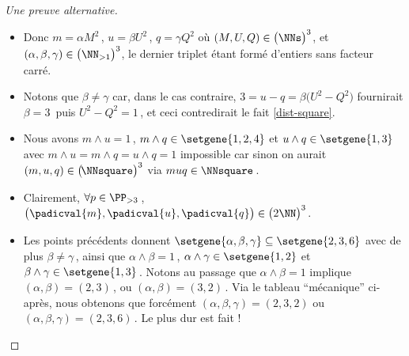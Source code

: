\begin{proof}[Une preuve alternative]
\begin{itemize}
\begin{enumerate}
			\item $q \in \NNsquare$ donne les équivalences logiques suivantes qui lèvent une contradiction.

        	\smallskip

			\begin{stepcalc}[style = sar, ope = \iff]
        		m^2 - 4 \in \NNsquare
        	\explnext{}
        		\exists r \in \NN \,.\, \big( m^2 - r^2 = 4 \big)
        		m = 2
        	\end{stepcalc}
		\end{enumerate}		





		\item Donc $m = \alpha M^2$\,, $u = \beta U^2$\,, $q = \gamma Q^2$ où $(M, U, Q) \in \big( \NNs \big)^3$, et $(\alpha, \beta, \gamma) \in \big( \NN_{>1} \big)^3$, le dernier triplet étant formé d'entiers sans facteur carré.


		\item Notons que $\beta \neq \gamma$ car, dans le cas contraire, $3 = u - q = \beta \big( U^2 - Q^2 \big)$ fournirait $\beta = 3$\, puis $U^2 - Q^2 = 1$\,, et ceci contredirait le fait \ref{dist-square}.


		\item Nous avons $m \wedge u = 1$\,, $m \wedge q \in \setgene{1, 2, 4}$ et $u \wedge q \in \setgene{1, 3}$
		avec $m \wedge u = m \wedge q = u \wedge q = 1$ impossible car sinon on aurait $(m, u, q) \in \big( \kern-1.5pt\NNsquare \big)^3$ via $muq \in \NNsquare$\,.


		\item Clairement, $\forall p \in \PP_{>3}$\,, $\big( \padicval{m} , \padicval{u} , \padicval{q} \big) \in \big( 2 \NN \big)^3$.


		\item Les points précédents donnent 
		$\setgene{\alpha, \beta, \gamma} \subseteq \setgene{2, 3, 6}$
		avec de plus
		$\beta \neq \gamma$\,,
		ainsi que 
		$\alpha \wedge \beta = 1$\,, $\alpha \wedge \gamma \in \setgene{1, 2}$ et $\beta \wedge \gamma \in \setgene{1, 3}$\,.
		Notons au passage que $\alpha \wedge \beta = 1$ implique $(\alpha, \beta) = (2, 3)$\,, ou $(\alpha, \beta) = (3, 2)$\,.
		Via le tableau \enquote{mécanique} ci-après, nous obtenons que forcément $(\alpha, \beta, \gamma) = (2, 3, 2)$ ou $(\alpha, \beta, \gamma) = (2, 3, 6)$\,. Le plus dur est fait !
	\end{itemize}


\end{proof}
